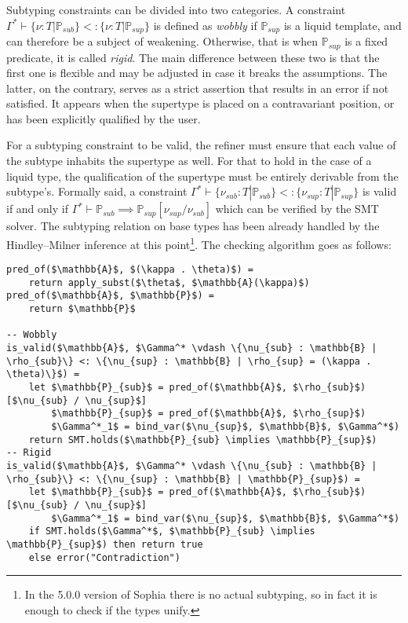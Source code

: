 Subtyping constraints can be divided into two categories. A constraint $\Gamma^*
\vdash \{\nu : T | \mathbb{P}_{sub}\} <: \{\nu : T | \mathbb{P}_{sup}\}$ is
defined as \emph{wobbly} if $\mathbb{P}_{sup}$ is a liquid template, and can
therefore be a subject of weakening. Otherwise, that is when $\mathbb{P}_{sup}$
is a fixed predicate, it is called \emph{rigid}. The main difference between
these two is that the first one is flexible and may be adjusted in case it
breaks the assumptions. The latter, on the contrary, serves as a strict
assertion that results in an error if not satisfied. It appears when the
supertype is placed on a contravariant position, or has been explicitly
qualified by the user.

For a subtyping constraint to be valid, the refiner must ensure that each value
of the subtype inhabits the supertype as well. For that to hold in the case of a
liquid type, the qualification of the supertype must be entirely derivable from
the subtype's. Formally said, a constraint $\Gamma^* \vdash \{\nu_{sub} : T |
\mathbb{P}_{sub}\} <: \{\nu_{sup} : T | \mathbb{P}_{sup}\}$ is valid if and only
if $\Gamma^* \vdash \mathbb{P}_{sub} \implies
\mathbb{P}_{sup}[\nu_{sup}/\nu_{sub}]$ which can be verified by the SMT solver.
The subtyping relation on base types has been already handled by the
Hindley--Milner inference at this point\footnote{In the 5.0.0 version of Sophia
  there is no actual subtyping, so in fact it is enough to check if the types
  unify.}. The checking algorithm goes as follows:

\begin{lstlisting}[language=pseudocode]
pred_of($\mathbb{A}$, $(\kappa . \theta)$) =
    return apply_subst($\theta$, $\mathbb{A}(\kappa)$)
pred_of($\mathbb{A}$, $\mathbb{P}$) =
    return $\mathbb{P}$

-- Wobbly
is_valid($\mathbb{A}$, $\Gamma^* \vdash \{\nu_{sub} : \mathbb{B} | \rho_{sub}\} <: \{\nu_{sup} : \mathbb{B} | \rho_{sup} = (\kappa . \theta)\}$) =
    let $\mathbb{P}_{sub}$ = pred_of($\mathbb{A}$, $\rho_{sub}$)[$\nu_{sub} / \nu_{sup}$]
        $\mathbb{P}_{sup}$ = pred_of($\mathbb{A}$, $\rho_{sup}$)
        $\Gamma^*_1$ = bind_var($\nu_{sup}$, $\mathbb{B}$, $\Gamma^*$)
    return SMT.holds($\mathbb{P}_{sub} \implies \mathbb{P}_{sup}$)
-- Rigid
is_valid($\mathbb{A}$, $\Gamma^* \vdash \{\nu_{sub} : \mathbb{B} | \rho_{sub}\} <: \{\nu_{sup} : \mathbb{B} | \mathbb{P}_{sup}$) =
    let $\mathbb{P}_{sub}$ = pred_of($\mathbb{A}$, $\rho_{sub}$)[$\nu_{sub} / \nu_{sup}$]
        $\Gamma^*_1$ = bind_var($\nu_{sup}$, $\mathbb{B}$, $\Gamma^*$)
    if SMT.holds($\Gamma^*$, $\mathbb{P}_{sub} \implies \mathbb{P}_{sup}$) then return true
    else error("Contradiction")
\end{lstlisting}

